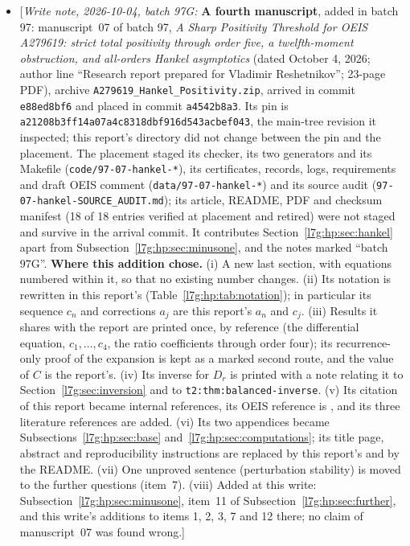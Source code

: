 \documentclass[11pt,letterpaper]{article}
\newcommand{\file}[1]{\nolinkurl{#1}}
\theoremstyle{remark}\newtheorem{remark}[theorem]{Remark}
\newcommand{\hpnote}[1]{\textup{[}\emph{Write note, 2026-10-04, batch 97G:} #1\textup{]}}
\newcounter{l7gtrsavedeq}
\begin{document}
\begin{itemize}[leftmargin=2em]
{fixed-weight generators as its contribution are not carried; they are
replaced by the scope statement of Section~\ref{l7g:tr:sec:third}. (v) Its
abstract and title page are replaced by this report's; its reproducibility
section by the report README.}
\item \hpnote{\textbf{A fourth manuscript}, added in batch 97:
manuscript~07 of batch 97, \emph{A Sharp Positivity Threshold for OEIS
A279619: strict total positivity through order five, a twelfth-moment
obstruction, and all-orders Hankel asymptotics} (dated October 4, 2026;
author line ``Research report prepared for Vladimir Reshetnikov''; 23-page
PDF), archive \texttt{A279619\_Hankel\_Positivity.zip}, arrived in commit
\texttt{e88ed8bf6} and placed in commit \texttt{a4542b8a3}. Its pin is
\texttt{a21208b3ff14a07a4c8318dbf916d543acbef043}, the main-tree revision it
inspected; this report's directory did not change between the pin and the
placement. The placement staged its checker, its two generators and its
Makefile (\file{code/97-07-hankel-*}), its certificates, records, logs,
requirements and draft OEIS comment (\file{data/97-07-hankel-*}) and its
source audit (\file{97-07-hankel-SOURCE_AUDIT.md}); its article, README,
PDF and checksum manifest (18 of 18 entries verified at placement and
retired) were not staged and survive in the arrival commit. It contributes
Section~\ref{l7g:hp:sec:hankel} apart from
Subsection~\ref{l7g:hp:sec:minusone}, and the notes marked ``batch 97G''.
\textbf{Where this addition chose.} (i) A new last section, with equations
numbered within it, so that no existing number changes. (ii) Its notation
is rewritten in this report's (Table~\ref{l7g:hp:tab:notation}); in
particular its sequence $c_n$ and corrections $a_j$ are this report's $a_n$
and $c_j$. (iii) Results it shares with the report are printed once, by
reference (the differential equation, $c_1,\dots,c_4$, the ratio
coefficients through order four); its recurrence-only proof of the
expansion is kept as a marked second route, and the value of $C$ is the
report's. (iv) Its inverse for $D_r$ is printed with a note relating it to
Section~\ref{l7g:sec:inversion} and to \texttt{t2:thm:balanced-inverse}.
(v) Its citation of this report became internal references, its OEIS
reference is \cite{l7g:oeis279619}, and its three literature references are
added. (vi) Its two appendices became Subsections~\ref{l7g:hp:sec:base}
and~\ref{l7g:hp:sec:computations}; its title page, abstract and
reproducibility instructions are replaced by this report's and by the
README. (vii) One unproved sentence (perturbation stability) is moved to
the further questions (item~7). (viii) Added at this write:
Subsection~\ref{l7g:hp:sec:minusone}, item~11 of
Subsection~\ref{l7g:hp:sec:further}, and this write's additions to items 1,
2, 3, 7 and 12 there; no claim of manuscript~07 was found wrong.}
\end{itemize}
\end{document}
